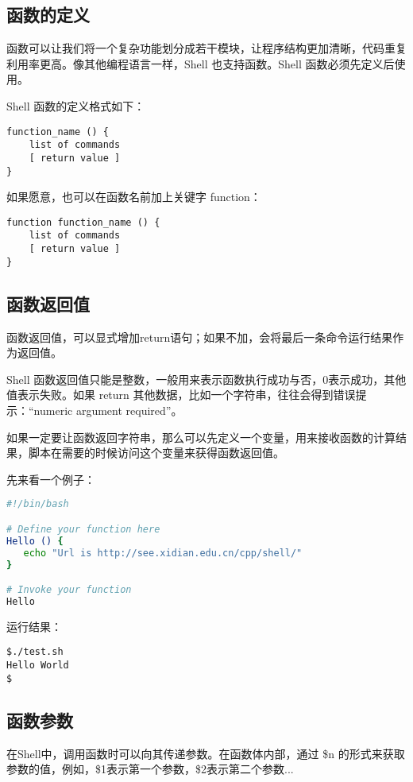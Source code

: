 \subsection{函数的定义}
函数可以让我们将一个复杂功能划分成若干模块，让程序结构更加清晰，代码重复利用率更高。像其他编程语言一样，Shell 也支持函数。Shell 函数必须先定义后使用。

Shell 函数的定义格式如下：
\begin{verbatim}
function_name () {
    list of commands
    [ return value ]
}
\end{verbatim}

如果愿意，也可以在函数名前加上关键字 function：
\begin{verbatim}
function function_name () {
    list of commands
    [ return value ]
}
\end{verbatim}


\subsection{函数返回值}
函数返回值，可以显式增加return语句；如果不加，会将最后一条命令运行结果作为返回值。

Shell 函数返回值只能是整数，一般用来表示函数执行成功与否，0表示成功，其他值表示失败。如果 return 其他数据，比如一个字符串，往往会得到错误提示：“numeric argument required”。

如果一定要让函数返回字符串，那么可以先定义一个变量，用来接收函数的计算结果，脚本在需要的时候访问这个变量来获得函数返回值。

先来看一个例子：
\begin{lstlisting}[language=sh]
#!/bin/bash

# Define your function here
Hello () {
   echo "Url is http://see.xidian.edu.cn/cpp/shell/"
}

# Invoke your function
Hello
\end{lstlisting}
运行结果：
\begin{verbatim}
$./test.sh
Hello World
$
\end{verbatim}


\subsection{函数参数}
在Shell中，调用函数时可以向其传递参数。在函数体内部，通过 \$n 的形式来获取参数的值，例如，\$1表示第一个参数，\$2表示第二个参数...

